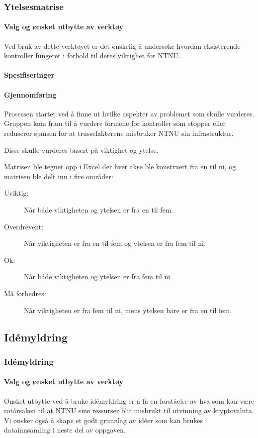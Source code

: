 \subsubsection{Ytelsesmatrise}

\paragraph{Valg og ønsket utbytte av verktøy}

Ved bruk av dette verktøyet er det ønskelig å undersøke hvordan eksisterende kontroller fungerer i forhold til deres viktighet for NTNU. 

\paragraph{Spesifiseringer}


\paragraph{Gjennomføring}
Prosessen startet ved å finne ut hvilke aspekter av problemet som skulle vurderes. Gruppen kom fram til å vurdere formene for kontroller som stopper eller reduserer sjansen for at trusselaktørene misbruker NTNU sin infrastruktur. 

Disse skulle vurderes basert på viktighet og ytelse. 

Matrisen ble tegnet opp i Excel der hver akse ble konstruert fra en til ni, og matrisen ble delt inn i fire områder:
\begin{description}
    \item[Uviktig:] Når både viktigheten og ytelsen er fra en til fem.
    \item[Overdrevent:] Når viktigheten er fra en til fem og ytelsen er fra fem til ni.
    \item[Ok:] Når både viktigheten og ytelsen er fra fem til ni.
    \item[Må forbedres:] Når viktigheten er fra fem til ni, mens ytelsen bare er fra en til fem.
\end{description}


\subsection{Idémyldring}
\subsubsection{Idémyldring}
\paragraph{Valg og ønsket utbytte av verktøy}
Ønsket utbytte ved å bruke idémyldring er å få en forståelse av hva som kan være rotårsaken til at NTNU sine ressurser blir misbrukt til utvinning av kryptovaluta. Vi ønsker også å skape et godt grunnlag av idéer som kan brukes i datainnsamling i neste del av oppgaven.

